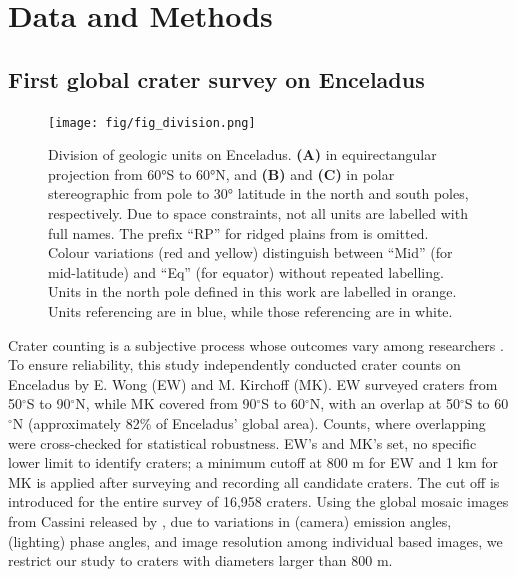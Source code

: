\documentclass[preprint,11pt,3p,times,authoryear]{elsarticle}
\begin{document}

\section{Data and Methods}
\label{sec:data}

\subsection{First global crater survey on Enceladus}
\label{subsec:crater_count}

\begin{figure}[ht!]
    \centering
    \texttt{[image: fig/fig\_division.png]}
    \caption{Division of geologic units on Enceladus. \textbf{(A)} in equirectangular projection from  60°S to  60°N, and \textbf{(B)} and \textbf{(C)}  in polar stereographic from pole to 30° latitude in the north and south poles, respectively. Due to space constraints, not all units are labelled with full names. The prefix “RP” for ridged plains from \citet{Kirchoff2009} is omitted. Colour variations (red and yellow) distinguish between “Mid” (for mid-latitude) and “Eq” (for equator) without repeated labelling. Units in the north pole defined in this work are labelled in orange. Units referencing \citet{Kirchoff2009} are in blue, while those referencing \citet{CrowWillard2015} are in white. }
    \label{fig:division}
\end{figure}

Crater counting is a subjective process whose outcomes vary among researchers \citep{Robbins2014}. To ensure reliability, this study independently conducted crater counts on Enceladus by E. Wong (EW) and M. Kirchoff (MK). EW surveyed craters from 50$^\circ$S to 90$^\circ$N, while MK covered from 90$^\circ$S to 60$^\circ$N, with an overlap at 50$^\circ$S to 60$^\circ$N (approximately 82\% of Enceladus' global area). Counts, where overlapping were cross-checked for statistical robustness. EW’s and MK’s set, no specific lower limit to identify craters; a minimum cutoff at 800 m for EW and 1 km for MK is applied after surveying and recording all candidate craters. The cut off is introduced for the entire survey of 16,958 craters. Using the global mosaic images from Cassini released by \citet{Bland2018}, due to variations in (camera) emission angles, (lighting) phase angles, and image resolution among individual based images, we restrict our study to craters with diameters larger than 800 m. \\
\end{document}
